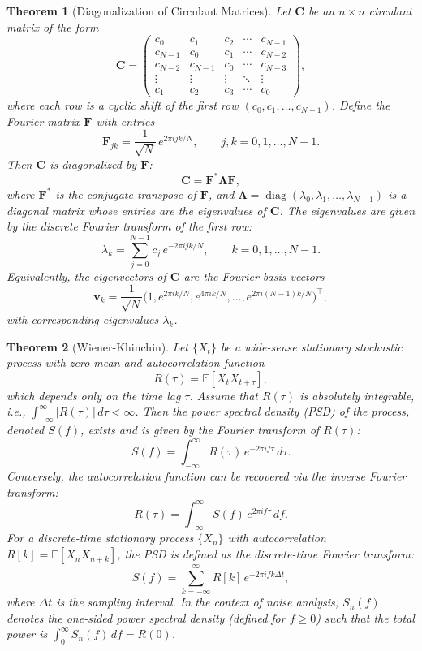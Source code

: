 \documentclass[12pt, a4paper]{article}
\newcounter{lecture}              %
\theoremstyle{plain} %
\newtheorem{theorem}{Theorem}[lecture]      %
\theoremstyle{definition} %
\begin{document}
\begin{theorem}[Diagonalization of Circulant Matrices]
    Let $\mathbf{C}$ be an $n \times n$ circulant matrix of the form
    \[
    \mathbf{C} = \begin{pmatrix}
    c_0 & c_1 & c_2 & \cdots & c_{N-1} \\
    c_{N-1} & c_0 & c_1 & \cdots & c_{N-2} \\
    c_{N-2} & c_{N-1} & c_0 & \cdots & c_{N-3} \\
    \vdots & \vdots & \vdots & \ddots & \vdots \\
    c_1 & c_2 & c_3 & \cdots & c_0
    \end{pmatrix},
    \]
    where each row is a cyclic shift of the first row $(c_0, c_1, \dots, c_{N-1})$. 
    Define the Fourier matrix $\mathbf{F}$ with entries
    \[
    \mathbf{F}_{jk} = \frac{1}{\sqrt{N}} \, e^{2\pi i jk / N}, \qquad j,k = 0,1,\dots,N-1.
    \]
    Then $\mathbf{C}$ is diagonalized by $\mathbf{F}$:
    \[
    \mathbf{C} = \mathbf{F}^* \mathbf{\Lambda} \mathbf{F},
    \]
    where $\mathbf{F}^*$ is the conjugate transpose of $\mathbf{F}$, and $\mathbf{\Lambda} = \operatorname{diag}(\lambda_0, \lambda_1, \dots, \lambda_{N-1})$ is a diagonal matrix whose entries are the eigenvalues of $\mathbf{C}$. The eigenvalues are given by the discrete Fourier transform of the first row:
    \[
    \lambda_k = \sum_{j=0}^{N-1} c_j \, e^{-2\pi i jk / N}, \qquad k = 0,1,\dots,N-1.
    \]
    Equivalently, the eigenvectors of $\mathbf{C}$ are the Fourier basis vectors
    \[
    \mathbf{v}_k = \frac{1}{\sqrt{N}} \big(1, e^{2\pi i k/N}, e^{4\pi i k/N}, \dots, e^{2\pi i (N-1)k/N} \big)^\top,
    \]
    with corresponding eigenvalues $\lambda_k$.
    \end{theorem}

\begin{theorem}[Wiener-Khinchin]
    Let $\{X_t\}$ be a wide-sense stationary stochastic process with zero mean and autocorrelation function
    \[
    R(\tau) = \mathbb{E}[X_t X_{t+\tau}],
    \]
    which depends only on the time lag $\tau$. Assume that $R(\tau)$ is absolutely integrable, i.e., $\int_{-\infty}^{\infty} |R(\tau)| \, d\tau < \infty$. Then the power spectral density (PSD) of the process, denoted $S(f)$, exists and is given by the Fourier transform of $R(\tau)$:
    \[
    S(f) = \int_{-\infty}^{\infty} R(\tau) \, e^{-2\pi i f \tau} \, d\tau.
    \]
    Conversely, the autocorrelation function can be recovered via the inverse Fourier transform:
    \[
    R(\tau) = \int_{-\infty}^{\infty} S(f) \, e^{2\pi i f \tau} \, df.
    \]
    For a discrete-time stationary process $\{X_n\}$ with autocorrelation $R[k] = \mathbb{E}[X_n X_{n+k}]$, the PSD is defined as the discrete-time Fourier transform:
    \[
    S(f) = \sum_{k=-\infty}^{\infty} R[k] \, e^{-2\pi i f k \Delta t},
    \]
    where $\Delta t$ is the sampling interval. In the context of noise analysis, $S_n(f)$ denotes the one-sided power spectral density (defined for $f \ge 0$) such that the total power is $\int_0^\infty S_n(f) \, df = R(0)$.
    \end{theorem}
    
\end{document}

